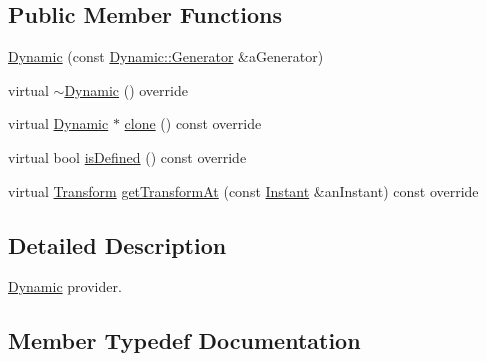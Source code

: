 \subsection*{Public Member Functions}
\begin{DoxyCompactItemize}
\item 
\hyperlink{classlibrary_1_1physics_1_1coord_1_1frame_1_1provider_1_1_dynamic_a9969003390848043b95d6ee4f451eade}{Dynamic} (const \hyperlink{classlibrary_1_1physics_1_1coord_1_1frame_1_1provider_1_1_dynamic_a143db93d5b57faf0e91a812f4203a630}{Dynamic\+::\+Generator} \&a\+Generator)
\item 
virtual \hyperlink{classlibrary_1_1physics_1_1coord_1_1frame_1_1provider_1_1_dynamic_abca1b794d3c6a306fcbc1eef091330b7}{$\sim$\+Dynamic} () override
\item 
virtual \hyperlink{classlibrary_1_1physics_1_1coord_1_1frame_1_1provider_1_1_dynamic}{Dynamic} $\ast$ \hyperlink{classlibrary_1_1physics_1_1coord_1_1frame_1_1provider_1_1_dynamic_a9d1c9b905420f026fa2f9c26305e47fd}{clone} () const override
\item 
virtual bool \hyperlink{classlibrary_1_1physics_1_1coord_1_1frame_1_1provider_1_1_dynamic_a0527b3fd86cdd8070f1697c057f06479}{is\+Defined} () const override
\item 
virtual \hyperlink{classlibrary_1_1physics_1_1coord_1_1_transform}{Transform} \hyperlink{classlibrary_1_1physics_1_1coord_1_1frame_1_1provider_1_1_dynamic_af9d9f53d8269f24b6694494e5128f11e}{get\+Transform\+At} (const \hyperlink{classlibrary_1_1physics_1_1time_1_1_instant}{Instant} \&an\+Instant) const override
\end{DoxyCompactItemize}


\subsection{Detailed Description}
\hyperlink{classlibrary_1_1physics_1_1coord_1_1frame_1_1provider_1_1_dynamic}{Dynamic} provider. 

\subsection{Member Typedef Documentation}
\mbox{\label{classlibrary_1_1physics_1_1coord_1_1frame_1_1provider_1_1_dynamic_a143db93d5b57faf0e91a812f4203a630}} 
